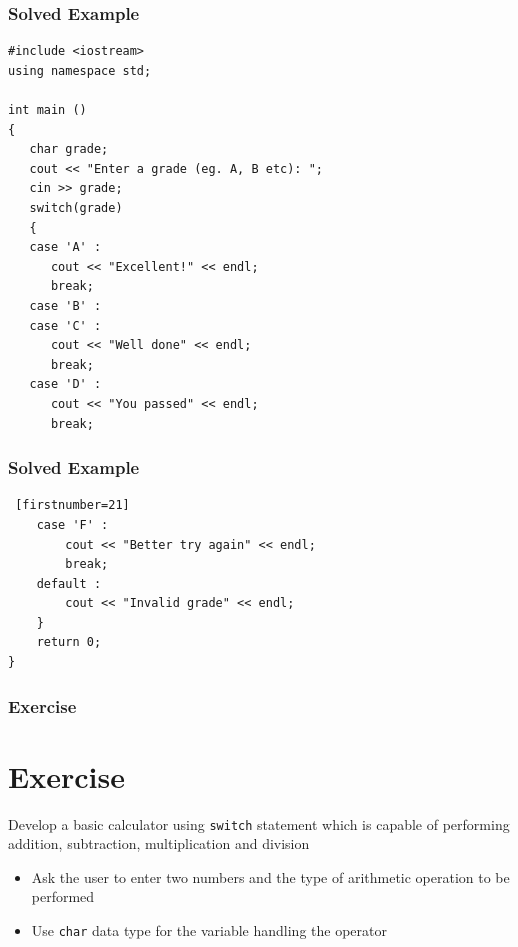 \documentclass{beamer}
\begin{document}
\begin{frame} [fragile]
    \frametitle{Solved Example}
    \lstset{style=mystyle}
    \begin{lstlisting}
#include <iostream>
using namespace std;

int main ()
{
   char grade;
   cout << "Enter a grade (eg. A, B etc): ";
   cin >> grade;
   switch(grade)
   {
   case 'A' :
      cout << "Excellent!" << endl;
      break;
   case 'B' :
   case 'C' :
      cout << "Well done" << endl;
      break;
   case 'D' :
      cout << "You passed" << endl;
      break;
\end{lstlisting}
\end{frame}

\begin{frame} [fragile]
    \frametitle{Solved Example}
    \lstset{style=mystyle}
    \begin{lstlisting} [firstnumber=21]
    case 'F' :
        cout << "Better try again" << endl;
        break;
    default :
        cout << "Invalid grade" << endl;
    }
    return 0;
}
\end{lstlisting}
\end{frame}

\begin{frame}
    \frametitle{Exercise}
    \section{Exercise} %
    \label{sec:exercise}
    Develop a basic calculator using \texttt{switch} statement which is capable of performing addition, subtraction, multiplication and division
    \begin{itemize}
        \item Ask the user to enter two numbers and the type of arithmetic operation to be performed
        \item Use \texttt{char} data type for the variable handling the operator
    \end{itemize}
\end{frame}
\end{document}
